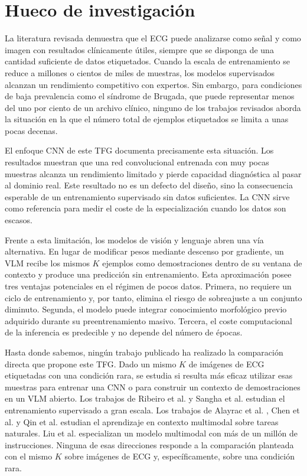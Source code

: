 \section{Hueco de investigación}

La literatura revisada demuestra que el ECG puede analizarse como señal y como imagen con resultados clínicamente útiles, siempre que se disponga de una cantidad suficiente de datos etiquetados. Cuando la escala de entrenamiento se reduce a millones o cientos de miles de muestras, los modelos supervisados alcanzan un rendimiento competitivo con expertos. Sin embargo, para condiciones de baja prevalencia como el síndrome de Brugada, que puede representar menos del uno por ciento de un archivo clínico, ninguno de los trabajos revisados aborda la situación en la que el número total de ejemplos etiquetados se limita a unas pocas decenas.

El enfoque CNN de este TFG documenta precisamente esta situación. Los resultados muestran que una red convolucional entrenada con muy pocas muestras alcanza un rendimiento limitado y pierde capacidad diagnóstica al pasar al dominio real. Este resultado no es un defecto del diseño, sino la consecuencia esperable de un entrenamiento supervisado sin datos suficientes. La CNN sirve como referencia para medir el coste de la especialización cuando los datos son escasos.

Frente a esta limitación, los modelos de visión y lenguaje abren una vía alternativa. En lugar de modificar pesos mediante descenso por gradiente, un VLM recibe los mismos \(K\) ejemplos como demostraciones dentro de su ventana de contexto y produce una predicción sin entrenamiento. Esta aproximación posee tres ventajas potenciales en el régimen de pocos datos. Primera, no requiere un ciclo de entrenamiento y, por tanto, elimina el riesgo de sobreajuste a un conjunto diminuto. Segunda, el modelo puede integrar conocimiento morfológico previo adquirido durante su preentrenamiento masivo. Tercera, el coste computacional de la inferencia es predecible y no depende del número de épocas.

Hasta donde sabemos, ningún trabajo publicado ha realizado la comparación directa que propone este TFG. Dado un mismo \(K\) de imágenes de ECG etiquetadas con una condición rara, se estudia si resulta más eficaz utilizar esas muestras para entrenar una CNN o para construir un contexto de demostraciones en un VLM abierto. Los trabajos de Ribeiro et al. \cite{ribeiro2020} y Sangha et al. \cite{sangha2022} estudian el entrenamiento supervisado a gran escala. Los trabajos de Alayrac et al. \cite{alayrac2022}, Chen et al. \cite{chen2024} y Qin et al. \cite{zhang2024mmicl} estudian el aprendizaje en contexto multimodal sobre tareas naturales. Liu et al. \cite{liu2026} especializan un modelo multimodal con más de un millón de instrucciones. Ninguna de esas direcciones responde a la comparación planteada con el mismo \(K\) sobre imágenes de ECG y, específicamente, sobre una condición rara.

